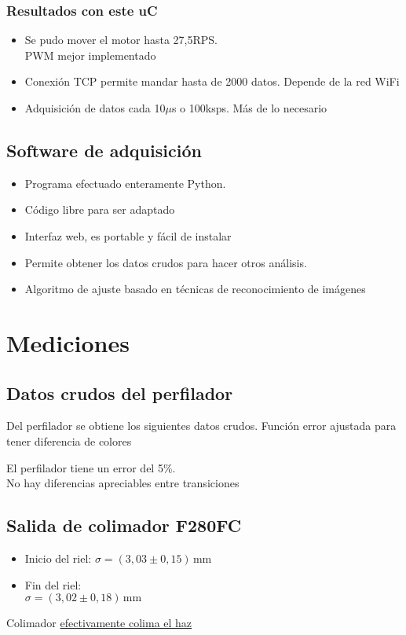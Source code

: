 \documentclass{article}
\begin{document}
     

    \subsubsection{Resultados con este uC}
        \begin{itemize}
            \item Se pudo mover el motor hasta 27,5RPS. \\PWM mejor implementado
            \item Conexión TCP permite mandar hasta de 2000 datos. Depende de la red WiFi
            \item Adquisición de datos cada 10$\mu$s o 100ksps. Más de lo necesario
        \end{itemize}

\subsection{Software de adquisición}

    \begin{itemize}
    \item Programa efectuado enteramente Python.
    \item Código libre para ser adaptado
    \item Interfaz web, es portable y fácil de instalar
    \item Permite obtener los datos crudos para hacer otros análisis.
    \item Algoritmo de ajuste basado en técnicas de reconocimiento de imágenes
    \end{itemize}


\section{Mediciones}

    \subsection{Datos crudos del perfilador}
    Del perfilador se obtiene los siguientes datos crudos.
Función error ajustada para tener diferencia de colores



    El perfilador tiene un error del 5\%.\\ No hay diferencias apreciables entre transiciones


    \subsection{Salida de colimador F280FC}
        \begin{itemize}
            \item Inicio del riel: $\sigma = (3,03 \pm 0,15)\,\text{mm}$
            \item Fin del riel:\\ $\sigma = (3,02 \pm 0,18)\,\text{mm}$
        \end{itemize}
        Colimador \underline{efectivamente colima el haz}
\end{document}
